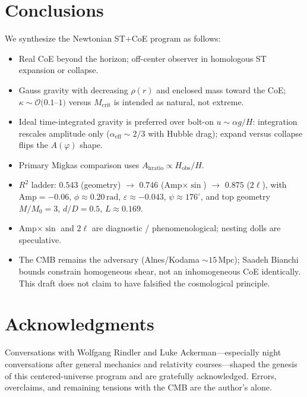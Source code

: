 \documentclass[11pt,a4paper]{article}
\begin{document}
\section{Conclusions}
\label{sec:concl}

We synthesize the Newtonian ST+CoE program as follows:
\begin{itemize}[leftmargin=*,itemsep=2pt]
\item Real CoE beyond the horizon; off-center observer in homologous ST
  expansion or collapse.
\item Gauss gravity with decreasing $\rho(r)$ and enclosed mass toward the CoE;
  $\kappa\sim\mathcal{O}(0.1$--$1)$ versus $M_{\mathrm{crit}}$ is intended as
  natural, not extreme.
\item Ideal time-integrated gravity is preferred over bolt-on
  $u\sim\alpha g/H$: integration rescales amplitude only
  ($\alpha_{\mathrm{eff}}\sim2/3$ with Hubble drag); expand versus collapse
  flips the $A(\varphi)$ shape.
\item Primary Migkas comparison uses
  $A_{\mathrm{hratio}}\propto H_{\mathrm{obs}}/H$.
\item $R^2$ ladder: $0.543$ (geometry) $\to$ $0.746$ (Amp$\times\sin$) $\to$
  $0.875$ ($2\ell$), with Amp$=-0.06$, $\phi\approx0.20\,\mathrm{rad}$,
  $\varepsilon\approx-0.043$, $\psi\approx176^\circ$, and top geometry
  $M/M_0=3$, $d/D=0.5$, $L\approx0.169$.
\item Amp$\times\sin$ and $2\ell$ are diagnostic / phenomenological; nesting
  dolls are speculative.
\item The CMB remains the adversary (Alnes/Kodama $\sim15\,\mathrm{Mpc}$);
  Saadeh Bianchi bounds constrain homogeneous shear, not an inhomogeneous CoE
  identically. This draft does not claim to have falsified the cosmological
  principle.
\end{itemize}

\section*{Acknowledgments}
\label{sec:ack}

Conversations with Wolfgang Rindler and Luke Ackerman---especially night
conversations after general mechanics and relativity courses---shaped the
genesis of this centered-universe program and are gratefully acknowledged.
Errors, overclaims, and remaining tensions with the CMB are the author's alone.
\end{document}
